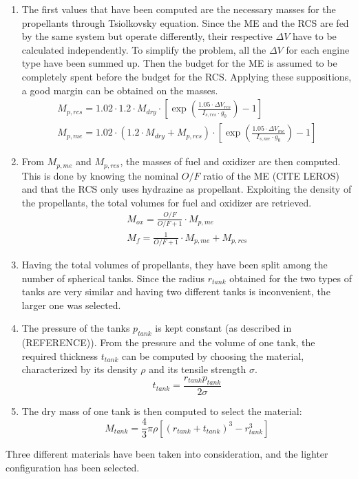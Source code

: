 \begin{enumerate}[itemsep=5mm]
    \item
    The first values that have been computed are the necessary masses for the propellants through Tsiolkovsky equation. Since the ME and the RCS are fed by the same system but operate differently, their respective $\Delta V$ have to be calculated independently. To simplify the problem, all the $\Delta V$ for each engine type have been summed up. Then the budget for the ME is assumed to be completely spent before the budget for the RCS. Applying these suppositions, a good margin can be obtained on the masses.
    \begin{gather}
        M_{p,rcs} = 1.02 \cdot 1.2 \cdot M_{dry} \cdot \left[ \exp \left( \frac{1.05 \cdot \Delta V_{rcs}}{I_{s,rcs} \cdot g_0} \right) - 1 \right]
        \\
        M_{p,me} = 1.02 \cdot \left( 1.2 \cdot M_{dry} + M_{p,rcs} \right) \cdot \left[ \exp \left( \frac{1.05 \cdot \Delta V_{me}}{I_{s,me} \cdot g_0} \right) - 1 \right]
    \end{gather}

    \item
    From $M_{p,me}$ and $M_{p,rcs}$, the masses of fuel and oxidizer are then computed. This is done by knowing the nominal $O/F$ ratio of the ME (CITE LEROS) and that the RCS only uses hydrazine as propellant.
    Exploiting the density of the propellants, the total volumes for fuel and oxidizer are retrieved.
    \begin{gather}
        M_{ox} = \frac{O/F}{O/F + 1} \cdot M_{p,me}
        \\
        M_{f} = \frac{1}{O/F + 1} \cdot M_{p,me} + M_{p,rcs}
    \end{gather}

    \item
    Having the total volumes of propellants, they have been split among the number of spherical tanks. Since the radius $r_{tank}$ obtained for the two types of tanks are very similar and having two different tanks is inconvenient, the larger one was selected.

    \item
    The pressure of the tanks $p_{tank}$ is kept constant (as described in (REFERENCE)). From the pressure and the volume of one tank, the required thickness $t_{tank}$ can be computed by choosing the material, characterized by its density $\rho$ and its tensile strength $\sigma$.
    \begin{equation}
        t_{tank} = \frac{r_{tank} p_{tank}}{2 \sigma}
    \end{equation}

    \item
    The dry mass of one tank is then computed to select the material:
    \begin{equation}
        M_{tank} = \frac{4}{3} \pi \rho \left[ \left( r_{tank} + t_{tank} \right)^3 - r_{tank}^3 \right]
    \end{equation}
\end{enumerate}

Three different materials have been taken into consideration, and the lighter configuration has been selected.